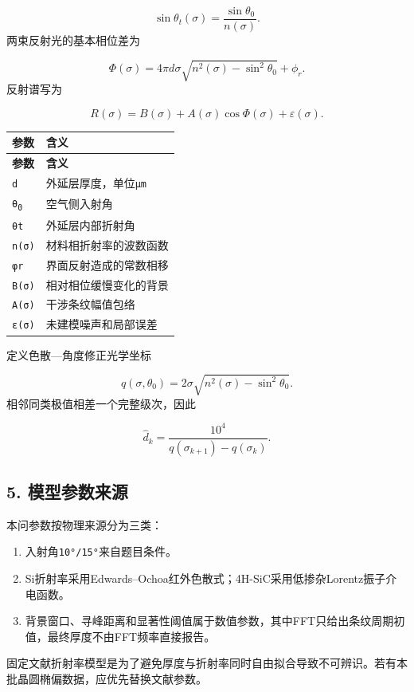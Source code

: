 \documentclass[11pt,a4paper]{ctexart}
\begin{document}
\[
\sin\theta_t(\sigma)=\frac{\sin\theta_0}{n(\sigma)}.
\]
两束反射光的基本相位差为


\[
\Phi(\sigma)=4\pi d\sigma\sqrt{n^2(\sigma)-\sin^2\theta_0}+\phi_r.
\]
反射谱写为


\[
R(\sigma)=B(\sigma)+A(\sigma)\cos\Phi(\sigma)+\varepsilon(\sigma).
\]
\begin{center}
\scriptsize
\begin{longtable}{|>{\raggedright\arraybackslash}p{}|>{\raggedright\arraybackslash}p{}|}
\hline
\textbf{参数} & \textbf{含义} \\ \hline
\endfirsthead
\hline \textbf{参数} & \textbf{含义} \\ \hline
\endhead
\texttt{d} & 外延层厚度，单位\texttt{μm} \\ \hline
\texttt{θ\textsubscript{0}} & 空气侧入射角 \\ \hline
\texttt{θt} & 外延层内部折射角 \\ \hline
\texttt{n(σ)} & 材料相折射率的波数函数 \\ \hline
\texttt{φr} & 界面反射造成的常数相移 \\ \hline
\texttt{B(σ)} & 相对相位缓慢变化的背景 \\ \hline
\texttt{A(σ)} & 干涉条纹幅值包络 \\ \hline
\texttt{ε(σ)} & 未建模噪声和局部误差 \\ \hline
\end{longtable}
\normalsize
\end{center}
定义色散—角度修正光学坐标


\[
q(\sigma,\theta_0)=2\sigma\sqrt{n^2(\sigma)-\sin^2\theta_0}.
\]
相邻同类极值相差一个完整级次，因此


\[
\hat d_k=\frac{10^4}{q(\sigma_{k+1})-q(\sigma_k)}.
\]
\subsection*{5. 模型参数来源}
本问参数按物理来源分为三类：


\begin{enumerate}
\item 入射角\texttt{10°/15°}来自题目条件。
\item Si折射率采用Edwards–Ochoa红外色散式；4H-SiC采用低掺杂Lorentz振子介电函数。
\item 背景窗口、寻峰距离和显著性阈值属于数值参数，其中FFT只给出条纹周期初值，最终厚度不由FFT频率直接报告。
\end{enumerate}
固定文献折射率模型是为了避免厚度与折射率同时自由拟合导致不可辨识。若有本批晶圆椭偏数据，应优先替换文献参数。
\end{document}
